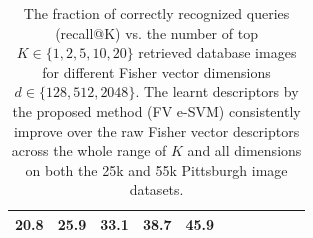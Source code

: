 \documentclass[10pt,twocolumn,letterpaper]{article}
\begin{document}
\begin{table}[t!]
\begin{centering}
\begin{tabularx}{0.75\linewidth}{|l|c c c c c|c c c c c|}
                    \textbf{20.8} & \textbf{25.9} & \textbf{33.1} & \textbf{38.7} & \textbf{45.9}\\
                  \hline
               \end{tabularx}
            \caption{ \textcolor{myRed}{}
                  The fraction of correctly recognized queries (recall@K) vs. the number of top $K\in\{1,2,5,10,20\}$ retrieved database images for different Fisher vector dimensions $d\in\{128,512,2048\}$. The learnt descriptors by the proposed method (FV e-SVM) consistently improve over the raw Fisher vector descriptors across the whole range of $K$  and all dimensions on both the 25k and 55k Pittsburgh image datasets.     
            }
            \label{tab:recall}
            \end{centering}
         \end{table}
\end{document}
